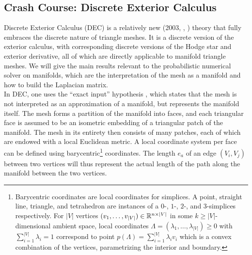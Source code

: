 \subsection*{Crash Course: Discrete Exterior Calculus}
Discrete Exterior Calculus (DEC) is a relatively new (2003, \cite{discrete_exterior_calculus_thesis}, \cite{discrete_exterior_calculus}) theory that fully embraces the discrete nature of triangle meshes. It is a discrete version of the exterior calculus, with corresponding discrete versions of the Hodge star and exterior derivative, all of which are directly applicable to manifold triangle meshes. We will give the main results relevant to the probabilistic numerical solver on manifolds, which are the interpretation of the mesh as a manifold and how to build the Laplacian matrix. 
\\
In DEC, one uses the “exact input” hypothesis \cite{sharp2021intrinsic}, which states that the mesh is not interpreted as an approximation of a manifold, but represents the manifold itself. The mesh forms a partition of the manifold into faces, and each triangular face is assumed to be an isometric embedding of a triangular patch of the manifold. The mesh in its entirety then consists of many patches, each of which are endowed with a local Euclidean metric. A local coordinate system per face can be defined using barycentric\footnote{Barycentric coordinates are local coordinates for simplices. A point, straight line, triangle, and tetrahedron are instances of a $0$-, $1$-, $2$-, and $3$-simplices respectively. For $|V|$ vertices $(v_1, \dots, v_{|V|})\in \mathbb{R}^{n \times |V|}$ in some $k \geq |V|$-dimensional ambient space, local coordinates $\Lambda = (\lambda_1, \dots, \lambda_{|V|}) \geq 0$ with $\sum_{i=1}^{|V|} \lambda_i = 1$ correspond to point $p(\Lambda) = \sum_{i=1}^{|V|} \lambda_i v_i$ which is a convex combination of the vertices, parametrizing the interior and boundary.} coordinates. The length $e_a$ of an edge $(V_i, V_j)$ between two vertices will thus represent the actual length of the path along the manifold between the two vertices.

